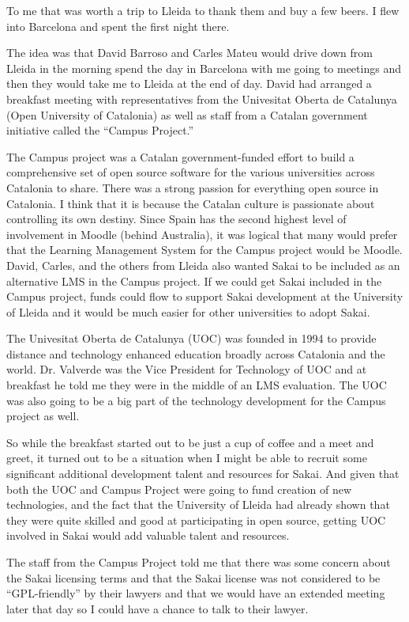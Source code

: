 \documentclass[12pt]{book}
\begin{document}
To me that was worth a trip to Lleida to  thank them and
buy a few beers.  I flew into Barcelona and spent the
first night there.

The idea was that David Barroso and Carles Mateu would drive
down from Lleida in the morning spend the day in
Barcelona with me going to meetings and then they would
take me to Lleida at the end of day.  David
had arranged a breakfast meeting with representatives from
the Univesitat Oberta de Catalunya (Open University of Catalonia)
as well as staff from a
Catalan government initiative called the ``Campus Project.''

The Campus project was a Catalan government-funded
effort to build a comprehensive set of open source software
for the various universities across Catalonia to share.
There was a strong passion for everything open source
in Catalonia.  I think that it is because the
Catalan culture is passionate about
controlling its own destiny.  Since Spain has the second
highest level of involvement in Moodle (behind Australia),
it was logical that many would prefer that
the Learning Management System for the Campus project would
be Moodle.  David, Carles, and the others from Lleida
also wanted Sakai to be included as an alternative LMS
in the Campus project.  If we could get Sakai included
in the Campus project, funds could flow to support
Sakai development at the University of Lleida and it would be
much easier for other universities to adopt Sakai.

The Univesitat Oberta de Catalunya (UOC) was founded in 1994
to provide distance
and technology enhanced education broadly across
Catalonia and the world.  Dr. Valverde
was the Vice President for Technology
of UOC and at breakfast he told me
they were in the middle of an LMS evaluation.
The UOC was also going to be a big part of the technology
development for the Campus project as well.

So while the breakfast started out to be just a cup of coffee
and a meet and greet, it turned out to be a situation
when I might be able to recruit some significant
additional development talent and resources for Sakai.
And given that both the UOC and Campus Project were
going to fund creation of new technologies, and the
fact that the University of Lleida had already shown
that they were quite skilled and good at participating in
open source, getting UOC involved in Sakai would add valuable
talent and resources.

The staff from the Campus Project told me that there
was some concern about the Sakai licensing terms
and that the Sakai license was not considered to
be ``GPL-friendly'' by their lawyers and that we would
have an extended meeting later that day so I could have
a chance to talk to their lawyer.
\end{document}
